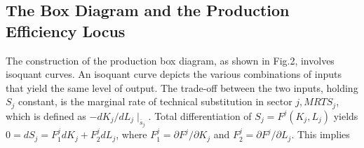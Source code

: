 \subsection{The Box Diagram and the Production Efficiency Locus}

The construction of the production box diagram, as shown in Fig.2, involves isoquant curves. An isoquant curve depicts the various combinations of inputs that yield the same level of output. The trade-off between the two inputs, holding $S_j$ constant, is the marginal rate of technical substitution in sector $j, MRTS_j$, which is defined as $-d K_j / d L_j \mid_{\bar{s}_j}$. Total differentiation of $S_j = F^j (K_j, L_j)$ yields $0 = dS_j = F_1^j dK_j + F_2^j dL_j$, where $F_1^j = \partial{F^j}/\partial{K_j}$ and $F_2^j = \partial{F^j}/\partial{L_j}$. This implies

